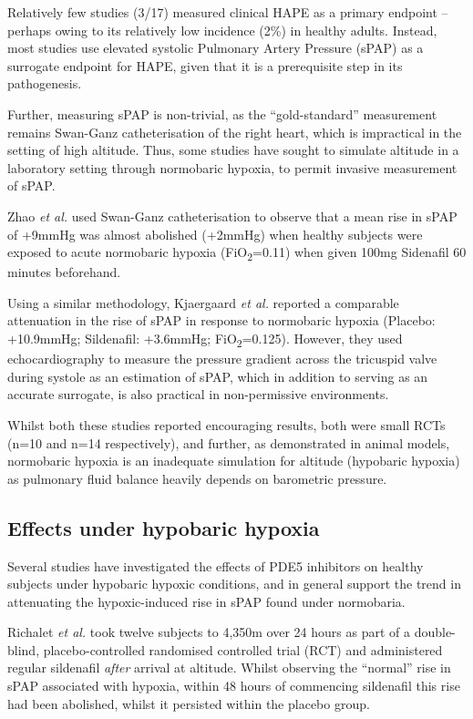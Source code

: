 \documentclass[10pt,a4paper]{article}
\begin{document}
Relatively few studies (3/17) measured clinical HAPE as a primary endpoint -- perhaps owing to its relatively low incidence (2\%) in healthy adults\cite{Bartsch:2002cg}. Instead, most studies use elevated systolic Pulmonary Artery Pressure (sPAP) as a surrogate endpoint for HAPE, given that it is a prerequisite step in its pathogenesis.\cite{Maggiorini:2001vq}

Further, measuring sPAP is non-trivial, as the ``gold-standard'' measurement remains Swan-Ganz catheterisation of the right heart, which is impractical in the setting of high altitude. Thus, some studies have sought to simulate altitude in a laboratory setting through normobaric hypoxia, to permit invasive measurement of sPAP.

Zhao \emph{et al.} used Swan-Ganz catheterisation to observe that a mean rise in sPAP of +9mmHg was almost abolished (+2mmHg) when healthy subjects were exposed to acute normobaric hypoxia (FiO\textsubscript{2}=0.11) when given 100mg Sidenafil 60 minutes beforehand.\cite{Zhao:2001kj}

Using a similar methodology, Kjaergaard \emph{et al.} reported a comparable attenuation in the rise of sPAP in response to normobaric hypoxia (Placebo: +10.9mmHg; Sildenafil: +3.6mmHg; FiO\textsubscript{2}=0.125).\cite{Kjaergaard:2007hp} However, they used echocardiography to measure the pressure gradient across the tricuspid valve during systole as an estimation of sPAP, which in addition to serving as an accurate surrogate, is also practical in non-permissive environments.\cite{Tramarin:1991uo,Allemann:2000tc}

Whilst both these studies reported encouraging results, both were small RCTs (n=10 and n=14 respectively), and further, as demonstrated in animal models, normobaric hypoxia is an inadequate simulation for altitude (hypobaric hypoxia) as pulmonary fluid balance heavily depends on barometric pressure.\cite{Bland:1977kz,Levine:1988uq}

\subsection*{Effects under hypobaric hypoxia}

Several studies have investigated the effects of PDE5 inhibitors on healthy subjects under hypobaric hypoxic conditions, and in general support the trend in attenuating the hypoxic-induced rise in sPAP found under normobaria.

Richalet \emph{et al.} took twelve subjects to 4,350m over 24 hours as part of a double-blind, placebo-controlled randomised controlled trial (RCT) and administered regular sildenafil \emph{after} arrival at altitude. Whilst observing the ``normal'' rise in sPAP associated with hypoxia, within 48 hours of commencing sildenafil this rise had been abolished, whilst it persisted within the placebo group.\cite{Richalet:2005el}
\end{document}
